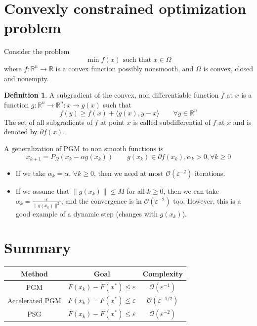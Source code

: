 \documentclass[12pt, openany]{report}
\newcommand{\R}{\mathbb{R}}
\theoremstyle{definition}
\newtheorem{definition}[thm]{Definition}
\begin{document}
\section{Convexly constrained optimization problem}
Consider the problem 
\begin{equation}
    \min f(x) \text{   such that   }x\in \Omega
\end{equation}
where \(f:\R^n\rightarrow \R\) is a convex function possibly nonsmooth, and \(\Omega\) is convex, closed and nonempty. 
\begin{definition}
    A subgradient of the convex, non differentiable function \(f\) at \(x\) is a function \(g:\R^n\rightarrow \R^n :x\rightarrow g(x)\) such that 
    \begin{equation}
        f(y) \ge f(x)+\langle g(x),y-x\rangle \qquad \forall y\in \R^n
    \end{equation}
    The set of all subgradients of \(f\) at point \(x\) is called subdifferential of \(f\) at \(x\) and is denoted by \(\partial f(x)\). 
\end{definition}
A generalization of PGM to non smooth functions is 
\begin{equation}
    x_{k+1} = P_\Omega (x_k-\alpha g(x_k)) \qquad g(x_k)\in \partial f(x_k),\alpha_k>0,\forall k\ge 0
\end{equation}
\begin{itemize}
    \item If we take \(\alpha_k=\alpha \), \(\forall k\ge 0\), then we need at most \(\mathcal{O}(\varepsilon^{-2})\) iterations. 
    \item If we assume that \(\lVert g(x_k)\rVert \le M\) for all \(k\ge 0\), then we can take \(\alpha_k = \frac{\varepsilon}{\lVert g(x_k)\rVert^2}\), and the convergence is in \(\mathcal{O}(\varepsilon^{-2})\) too. However, this is a good example of a dynamic step (changes with \(g(x_k)\)). 
\end{itemize}
\section{Summary}
\begin{center}
    \renewcommand{\arraystretch}{1.5}
    \begin{tabular}{c|c|c}\label{tab:summary_GM}
    Method & Goal & Complexity\\ \hline\hline
    PGM & \(F(x_k)-F(x^*)\le \varepsilon\) & \(\mathcal{O}(\varepsilon^{-1})\)\\ \hline
    Accelerated PGM & \(F(x_k)-F(x^*)\le \varepsilon\) & \(\mathcal{O}(\varepsilon^{-1/2})\)\\ \hline
    PSG & \(F(x_k)-F(x^*)\le \varepsilon\) & \(\mathcal{O}(\varepsilon^{-2})\)\\
    \end{tabular}
\end{center}
\end{document}
